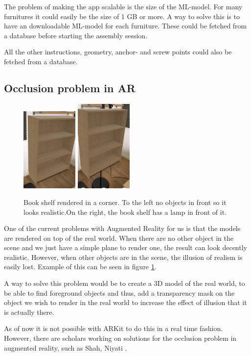 The problem of making the app scalable is the size of the ML-model. For many furnitures it could
easily be the size of 1 GB or more. A way to solve this is to have an downloadable ML-model for each 
furniture. These could be fetched from a database before starting the assembly session.

All the other instructions, geometry, anchor- and screw points could also be fetched from a database.

\subsection{Occlusion problem in AR}
\begin{figure}[hbtp]
\begin{center}
\includegraphics[width = 0.25\textwidth]{./Images/overlapping2.jpg} 
\includegraphics[width = 0.25\textwidth]{./Images/overlapping1.jpg} 
\caption{Book shelf rendered in a corner. To the left no objects in front so it looks realistic.On the right, the book shelf has a lamp in front of it.}
\label{fig:occlusion}
\end{center}
\end{figure}

One of the current problems with Augmented Reality for us is that the models are rendered on top of the real world. When there are no other object in the scene and we just have a simple plane to render one, the result can look decently realistic. However, when other objects are in the scene, the  illusion of realism is easily lost. Example of this can be seen in figure \ref{fig:occlusion}. 

A way to solve this problem would be to create a 3D model of the real world, to be able to find foreground objects and thus, add a transparency mask on the object we wish to render in the real world to increase the effect of illusion that it is actually there.

As of now it is not possible with ARKit to do this in a real time fashion. However, there are scholars working on solutions for the occlusion problem in augmented reality, such as Shah, Niyati \cite{occlusion}.

\newpage
